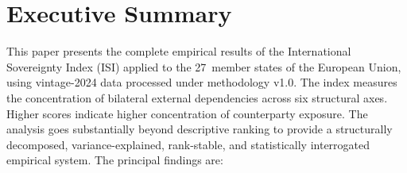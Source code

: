 \section*{Executive Summary}\label{sec:executive-summary}

This paper presents the complete empirical results of the International
Sovereignty Index (ISI) applied to the 27~member states of the European
Union, using vintage-2024 data processed under methodology v1.0.  The
index measures the concentration of bilateral external dependencies
across six structural axes.  Higher scores indicate higher concentration
of counterparty exposure.  The analysis goes substantially beyond
descriptive ranking to provide a structurally decomposed,
variance-explained, rank-stable, and statistically interrogated
empirical system.  The principal findings are:

